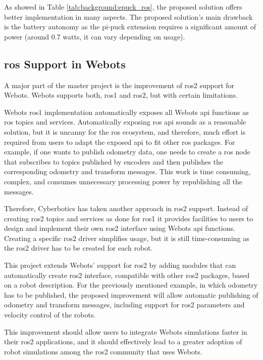 As showed in Table \ref{tab:background:epuck_ros}, the proposed solution offers better implementation in many aspects.
The proposed solution's main drawback is the battery autonomy as the pi-puck extension requires a significant amount of power (around 0.7 watts, it can vary depending on usage).


\subsection{\ac{ros} Support in Webots}
A major part of the master project is the improvement of \ac{ros2} support for Webots.
Webots supports both, \ac{ros1} and \ac{ros2}, but with certain limitations.

Webots \ac{ros1} implementation automatically exposes all Webots \ac{api} functions as \ac{ros} topics and services.
Automatically exposing \ac{ros} \ac{api} sounds as a reasonable solution, but it is uncanny for the \ac{ros} ecosystem, and therefore, much effort is required from users to adapt the exposed \ac{api} to fit other \ac{ros} packages.
For example, if one wants to publish odometry data, one needs to create a \ac{ros} node that subscribes to topics published by encoders and then publishes the corresponding odometry and transform messages. This work is time consuming, complex, and consumes unnecessary processing power by republishing all the messages.

Therefore, Cyberbotics has taken another approach in \ac{ros2} support.
Instead of creating \ac{ros2} topics and services as done for \ac{ros1} it provides facilities to users to design and implement their own \ac{ros2} interface using Webots \ac{api} functions.
Creating a specific \ac{ros2} driver simplifies usage, but it is still time-consuming as the \ac{ros2} driver has to be created for each robot.

This project extends Webots' support for \ac{ros2} by adding modules that can automatically create \ac{ros2} interface, compatible with other \ac{ros2} packages, based on a robot description.
For the previously mentioned example, in which odometry has to be published, the proposed improvement will allow automatic publishing of odometry and transform messages, including support for \ac{ros2} parameters and velocity control of the robots.

This improvement should allow users to integrate Webots simulations faster in their \ac{ros2} applications, and it should effectively lead to a greater adoption of robot simulations among the \ac{ros2} community that uses Webots.
